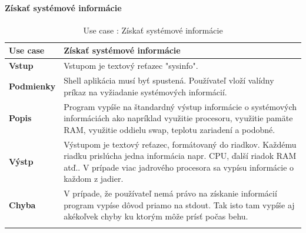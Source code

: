 \paragraph{Získať systémové informácie}
\begin{center}
	\begin{longtable}{|p{2.5cm}|p{14cm}|}
		
			\hline
			\textbf{Use case} & Získať systémové informácie \\ 
			\hline
			\textbf{Vstup} & Vstupom je textový reťazec "sysinfo".\\
			\hline
			\textbf{Podmienky} & Shell aplikácia musí byť spustená. Používateľ vloží valídny príkaz na vyžiadanie systémových informácií. \\ 
			\hline
			\textbf{Popis} & Program vypíše na štandardný výstup informácie o systémových informáciách ako napríklad využitie procesoru, využitie pamäte RAM, využitie oddielu swap, teplotu zariadení a podobné.\\ 
			\hline
					
			\textbf{Výstp} & Výstupom je textový reťazec, formátovaný do riadkov. Každému riadku prislúcha jedna informácia napr. CPU, ďalší riadok RAM atď.. V prípade viac jadrového procesora sa vypísu informácie o každom z jadier.  \\
			\hline
			\textbf{Chyba} & V prípade, že používateľ nemá právo na získanie informácií program vypíse dôvod priamo na stdout. Tak isto tam vypíše aj akékoľvek chyby ku ktorým môže prísť počas behu.\\
			\hline
		\caption{Use case : Získať systémové informácie}
		\label{table:1}
		
	\end{longtable}
\end{center}

